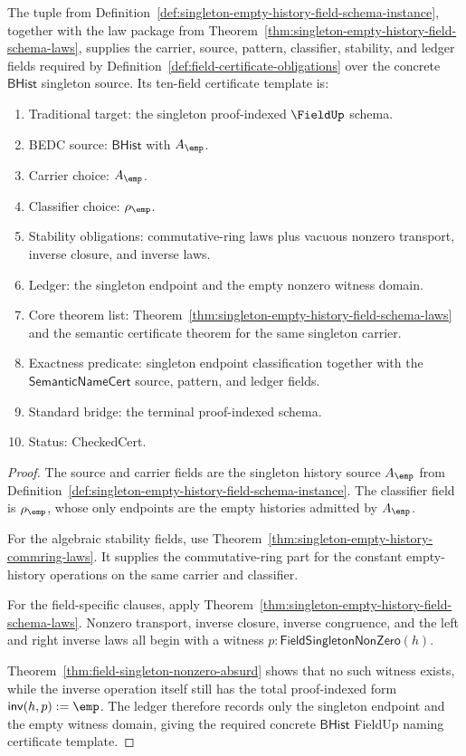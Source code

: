 \begin{theorem}
\label{thm:singleton-empty-history-field-schema-certificate}
The tuple from
Definition~\ref{def:singleton-empty-history-field-schema-instance}, together
with the law package from
Theorem~\ref{thm:singleton-empty-history-field-schema-laws}, supplies the
carrier, source, pattern, classifier, stability, and ledger fields required by
Definition~\ref{def:field-certificate-obligations} over the concrete
$\mathsf{BHist}$ singleton source. Its ten-field certificate template is:
\begin{enumerate}
  \item Traditional target: the singleton proof-indexed $\FieldUp$ schema.
  \item BEDC source: $\mathsf{BHist}$ with $A_{\emp}$.
  \item Carrier choice: $A_{\emp}$.
  \item Classifier choice: $\rho_{\emp}$.
  \item Stability obligations: commutative-ring laws plus vacuous nonzero
  transport, inverse closure, and inverse laws.
  \item Ledger: the singleton endpoint and the empty nonzero witness domain.
  \item Core theorem list:
  Theorem~\ref{thm:singleton-empty-history-field-schema-laws} and the
  semantic certificate theorem for the same singleton carrier.
  \item Exactness predicate: singleton endpoint classification together with
  the $\mathsf{SemanticNameCert}$ source, pattern, and ledger fields.
  \item Standard bridge: the terminal proof-indexed schema.
  \item Status: CheckedCert.
\end{enumerate}
\end{theorem}
\begin{proof}
The source and carrier fields are the singleton history source
$A_{\emp}$ from Definition~\ref{def:singleton-empty-history-field-schema-instance}.
The classifier field is $\rho_{\emp}$, whose only endpoints are the empty
histories admitted by $A_{\emp}$.

For the algebraic stability fields, use
Theorem~\ref{thm:singleton-empty-history-commring-laws}. It supplies the
commutative-ring part for the constant empty-history operations on the same
carrier and classifier.

For the field-specific clauses, apply
Theorem~\ref{thm:singleton-empty-history-field-schema-laws}. Nonzero transport,
inverse closure, inverse congruence, and the left and right inverse laws all
begin with a witness $p:\mathsf{FieldSingletonNonZero}(h)$.

Theorem~\ref{thm:field-singleton-nonzero-absurd} shows that
no such witness exists, while the inverse operation itself still has the total
proof-indexed form $\mathsf{inv}(h,p):=\emp$. The ledger therefore records only
the singleton endpoint and the empty witness domain, giving the required
concrete $\mathsf{BHist}$ FieldUp naming certificate template.
\end{proof}

